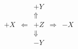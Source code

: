 \documentclass{article}
\begin{document}
\pagecolor{blue!20}
\huge \bf
\[
\begin{array}{ccccc}
  && +Y && \\
  &&\Uparrow && \\
+X & \Leftarrow & +Z & \Rightarrow & -X \\
  &&\Downarrow && \\
&& -Y && 
\end{array}
\]
\end{document}
